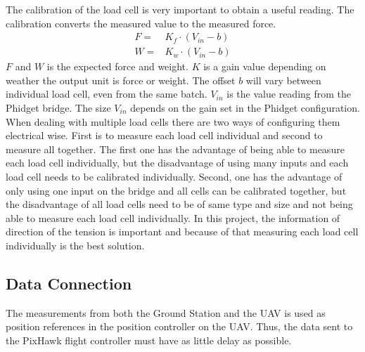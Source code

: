 \noindent
The calibration of the load cell is very important to obtain a useful reading. The calibration converts the measured value to the measured force.  
\begin{eqnarray}
F =& K_f \cdot (V_{in} - b)\\
W =& K_w \cdot (V_{in} - b)
\end{eqnarray}
$F$ and $W$ is the expected force and weight. $K$ is a gain value depending on weather the output unit is force or weight. The offset $b$ will vary between individual load cell, even from the same batch. $V_{in}$ is the value reading from the Phidget bridge. The size $V_{in}$ depends on the gain set in the Phidget configuration.\\
\noindent
When dealing with multiple load cells there are two ways of configuring them electrical wise. First is to measure each load cell individual and second to measure all together. The first one has the advantage of being able to measure each load cell individually, but the disadvantage of using many inputs and each load cell needs to be calibrated individually. Second, one has the advantage of only using one input on the bridge and all cells can be calibrated together, but the disadvantage of all load cells need to be of same type and size and not being able to measure each load cell individually. In this project, the information of direction of the tension is important and because of that measuring each load cell individually is the best solution\cite{PhidgetsInc.2012}.

\subsection{Data Connection}
The measurements from both the Ground Station and the UAV is used as position references in the position controller on the UAV. Thus, the data sent to the PixHawk flight controller must have as little delay as possible.

\newpage
